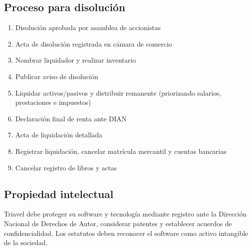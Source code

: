 \subsection*{Proceso para disolución}
\begin{enumerate}
    \item Disolución aprobada por asamblea de accionistas
    \item Acta de disolución registrada en cámara de comercio
    \item Nombrar liquidador y realizar inventario
    \item Publicar aviso de disolución
    \item Liquidar activos/pasivos y distribuir remanente (priorizando salarios, prestaciones e impuestos)
    \item Declaración final de renta ante DIAN
    \item Acta de liquidación detallada
    \item Registrar liquidación, cancelar matrícula mercantil y cuentas bancarias
    \item Cancelar registro de libros y actas
\end{enumerate}

\subsection*{Propiedad intelectual}
Triavel debe proteger su software y tecnología mediante registro ante la Dirección Nacional de Derechos de Autor, considerar patentes y establecer acuerdos de confidencialidad. Los estatutos deben reconocer el software como activo intangible de la sociedad.
